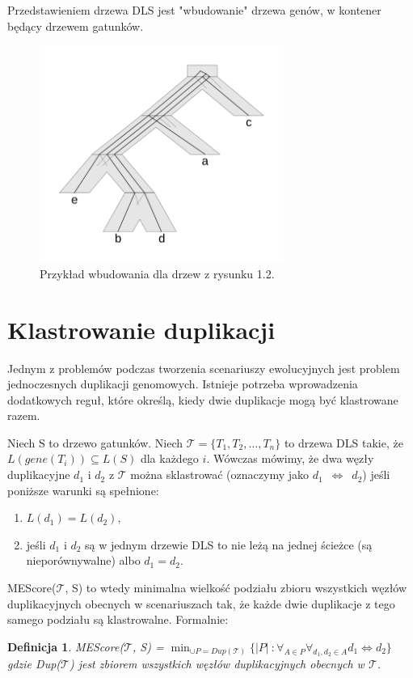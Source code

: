 \documentclass[licencjacka]{pracamgr}
\newtheorem{defi}{Definicja}[section]
\begin{document}
Przedstawieniem drzewa DLS jest "wbudowanie" drzewa genów, w kontener będący drzewem gatunków. 


\begin{figure}[H]
  \centering
  \includegraphics[width=80mm]{./pictures/optscen.png}
  \caption{Przykład wbudowania dla drzew z rysunku 1.2.}
\end{figure}

\section{Klastrowanie duplikacji}

Jednym z problemów podczas tworzenia scenariuszy ewolucyjnych jest problem jednoczesnych duplikacji genomowych. Istnieje potrzeba wprowadzenia dodatkowych reguł, które określą, kiedy dwie duplikacje mogą być klastrowane razem. 
 
Niech S to drzewo gatunków. Niech $\mathcal{T}=\{T_1,T_2, \dots , T_n\}$ to drzewa DLS takie, że $L(gene(T_i)) \subseteq L(S)$ dla każdego $i$. Wówczas mówimy, że dwa węzły duplikacyjne $d_1$ i $d_2$ z $\mathcal{T}$ można sklastrować (oznaczymy jako $d_1$~$\Longleftrightarrow$~$d_2$)  jeśli poniższe warunki są spełnione:
\begin{enumerate}
\item $L(d_1) = L({d_2})$,
\item jeśli $d_1$ i $d_2$ są w jednym drzewie DLS to nie leżą na jednej ścieżce (są nieporównywalne) albo $d_1=d_2$.
\end{enumerate}

MEScore($\mathcal{T}$, S) to wtedy minimalna wielkość podziału zbioru wszystkich węzłów duplikacyjnych obecnych w scenariuszach tak, że każde dwie duplikacje z tego samego podziału są klastrowalne. Formalnie:

\begin{defi}\label{ME}
  MEScore($\mathcal{T}$, S) = $\min_{\cup P = Dup(\mathcal{T})} \lbrace \vert P \vert\ : \forall_{A \in P} \forall_{d_1,d_2 \in A} d_1 \Longleftrightarrow d_2 \rbrace$
 gdzie Dup($\mathcal{T}$) jest zbiorem wszystkich węzłów duplikacyjnych obecnych w $\mathcal{T}$. 
\end{defi}
\end{document}

